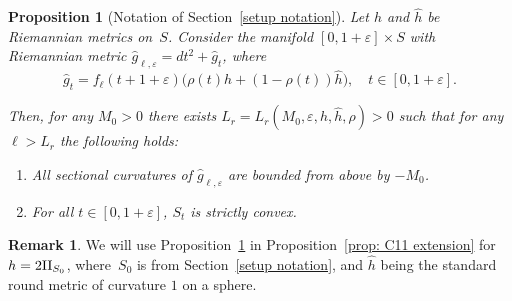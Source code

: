 \documentclass[JEP,XML,SOM,Unicode,NoFloatCountersInSection]{cedram}
\newenvironment{enumeratea}
{\bgroup\def\theenumi{\alph{enumi}}\begin{enumerate}}
{\end{enumerate}\egroup}
\newtheorem{proposition}[theorem]{Proposition}
\theoremstyle{definition}
\newtheorem{remark}[theorem]{Remark}
\let\eps\varepsilon
\newcommand{\RomanNumeralCaps}[1]
{\MakeUppercase{\romannumeral #1}}
\newcommand{\II}{\textup{\RomanNumeralCaps{2}}}
\renewcommand{\>}{{\rangle}}
\newcommand{\<}{{\langle}}
\begin{document}
\begin{proposition}[Notation of Section~\ref{setup notation}]
\label{prop: sectional 2}Let $h$ and $\hat h$ be Riemannian metrics on~$S$. Consider the manifold $[0,1+\eps]\times S$ with Riemannian metric $\hat g_{\ell,\eps} = dt^2+\hat g_t$, where
\[
\hat g_t = f_\ell(t+1+\eps)\bigl(\rho(t)h+(1-\rho(t))\hat h\bigr),\quad t\in[0,1+\eps].
\]

Then, for any $M_0>0$ there exists $L_r = L_r(M_0,\eps,h,\hat h,\rho)>0$ such that for any $\ell>L_r$ the following holds:
\begin{enumeratea}
\item\label{all negative} All sectional curvatures of $\hat g_{\ell,\eps}$ are bounded from above by $-M_0$.
\item\label{gen convexity 2} For all $t\in[0,1+\eps]$, $S_t$ is strictly convex.
\end{enumeratea}
\end{proposition}

\begin{remark}
We will use Proposition~\ref{prop: sectional 2} in Proposition~\ref{prop: C11 extension} for $h=2\II_{S_0}$, where~$S_0$ is from Section~\ref{setup notation}, and $\hat h$ being the standard round metric of curvature $1$ on a sphere.
\end{remark}
\end{document}
